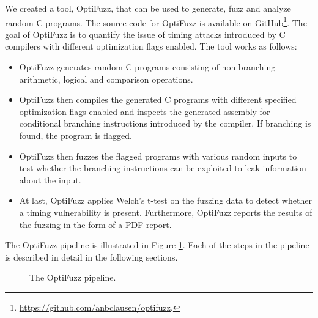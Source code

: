 \label{sec:optifuzz}
We created a tool, OptiFuzz, that can be used to generate, fuzz and analyze random C programs.
The source code for OptiFuzz is available on GitHub\footnote{\url{https://github.com/anbclausen/optifuzz}.}.
The goal of OptiFuzz is to quantify the issue of timing attacks introduced by C compilers with different optimization flags enabled.
The tool works as follows:
\begin{itemize}
  \item OptiFuzz generates random C programs consisting of non-branching arithmetic, logical and comparison operations.
  \item OptiFuzz then compiles the generated C programs with different specified optimization flags enabled and inspects the generated assembly for conditional branching instructions introduced by the compiler.
        If branching is found, the program is flagged.
  \item OptiFuzz then fuzzes the flagged programs with various random inputs to test whether the branching instructions can be exploited to leak information about the input.
  \item At last, OptiFuzz applies Welch's t-test on the fuzzing data to detect whether a timing vulnerability is present.
        Furthermore, OptiFuzz reports the results of the fuzzing in the form of a PDF report.
\end{itemize}
The OptiFuzz pipeline is illustrated in Figure \ref{fig:optifuzz-pipeline}. 
Each of the steps in the pipeline is described in detail in the following sections.
\begin{figure}[H]
  \centering
  
  \caption{The OptiFuzz pipeline.}
  \label{fig:optifuzz-pipeline}
\end{figure}
